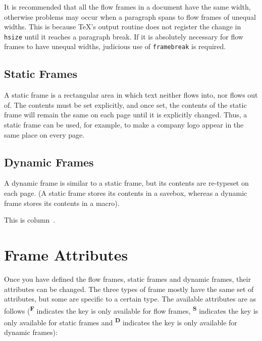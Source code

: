 \documentclass[a4paper]{report}
\newcommand{\cmdname}[1]{\texttt{\symbol{92}#1}}
\begin{document}
It is recommended that all the flow frames in a document
have the same width, otherwise problems may occur
when a paragraph spans to flow frames of unequal
widths. This is because \TeX's output routine does not
register the change in \cmdname{hsize} until it reaches
a paragraph break. If it is absolutely necessary for
flow frames to have unequal widths, judicious use of
\cmdname{framebreak} is required.

\section*{Static Frames}

A static frame is a rectangular area in which text neither
flows into, nor flows out of.  The contents must be set
explicitly, and once set, the contents of the static frame will
remain the same on each page until it is explicitly
changed.  Thus, a static frame can be used, for example, to make
a company logo appear in the same place on every page.

\section*{Dynamic Frames}

A dynamic frame is similar to a static frame, but its contents
are re-typeset on each page. (A static frame stores its
contents in a savebox, whereas a dynamic frame stores its
contents in a macro).

This is column~\thedisplayedframe.

\chapter{Frame Attributes}
\label{sec:modattr}

Once you have defined the {flow frames}, {static frames} and
{dynamic frames}, their attributes can be changed.
The three types of frame mostly have the
same set of attributes, but some are specific to a certain type.
The available attributes are as follows
(\textsuperscript{\textbf{F}} indicates the key is
only available for {flow frames},
\textsuperscript{\textbf{S}} indicates the key is only available
for {static frames}
and \textsuperscript{\textbf{D}} indicates the key
is only available for {dynamic frames}):
\end{document}
